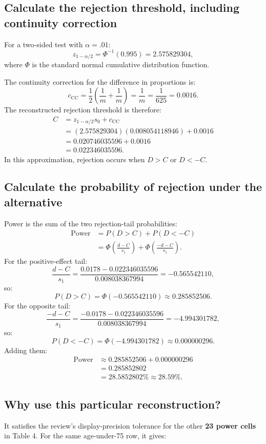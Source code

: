 \documentclass[UTF8,fontset=none,11pt,a4paper]{ctexart}
\begin{document}
\subsection{Calculate the rejection threshold, including continuity correction}
For a two-sided test with $\alpha=.01$:
\[
z_{1-\alpha/2}=\Phi^{-1}(0.995)=2.575829304,
\]
where $\Phi$ is the standard normal cumulative distribution function.

The continuity correction for the difference in proportions is:
\[
c_{\mathrm{CC}}
=\frac12\left(\frac1m+\frac1m\right)
=\frac1m
=\frac1{625}
=0.0016.
\]
The reconstructed rejection threshold is therefore:
\[
\begin{aligned}
C
&=z_{1-\alpha/2}s_0+c_{\mathrm{CC}}\\
&=(2.575829304)(0.008054118946)+0.0016\\
&=0.020746035596+0.0016\\
&=\boxed{0.022346035596}.
\end{aligned}
\]
In this approximation, rejection occurs when $D>C$ or $D<-C$.

\subsection{Calculate the probability of rejection under the alternative}
Power is the sum of the two rejection-tail probabilities:
\[
\begin{aligned}
\text{Power}
&=P(D>C)+P(D<-C)\\
&=\Phi\left(\frac{d-C}{s_1}\right)
+\Phi\left(\frac{-d-C}{s_1}\right).
\end{aligned}
\]
For the positive-effect tail:
\[
\frac{d-C}{s_1}
=\frac{0.0178-0.022346035596}{0.008038367994}
=-0.565542110,
\]
so:
\[
P(D>C)=\Phi(-0.565542110)\approx0.285852506.
\]
For the opposite tail:
\[
\frac{-d-C}{s_1}
=\frac{-0.0178-0.022346035596}{0.008038367994}
=-4.994301782,
\]
so:
\[
P(D<-C)=\Phi(-4.994301782)\approx0.000000296.
\]
Adding them:
\[
\boxed{
\begin{aligned}
\text{Power}
&\approx0.285852506+0.000000296\\
&=0.285852802\\
&=28.5852802\%\approx\mathbf{28.59\%}.
\end{aligned}
}
\]

\subsection{Why use this particular reconstruction?}
It satisfies the review's display-precision tolerance for the other \textbf{23 power cells} in Table 4. For the same age-under-75 row, it gives:
\end{document}
